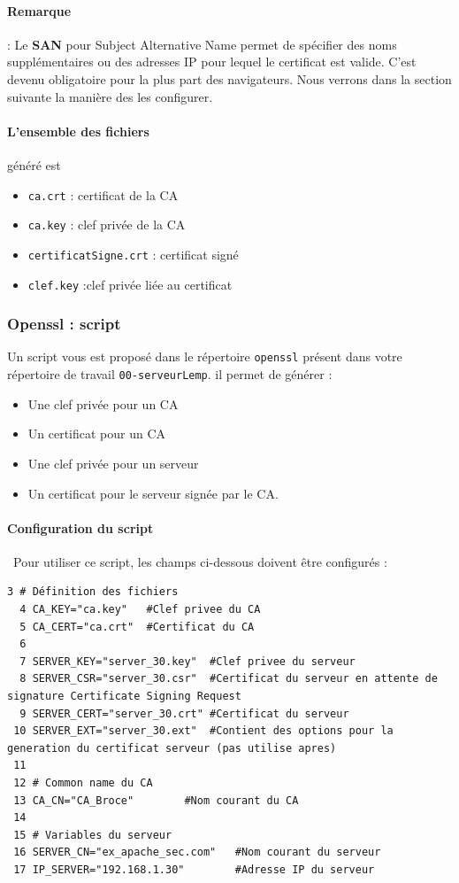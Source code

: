 \documentclass[french, 12pt]{article}%
\newcommand{\itemE}{\item[$\bullet$]}
\begin{document}
\paragraph{Remarque } :  Le \textbf{SAN} pour Subject Alternative Name permet de spécifier des noms supplémentaires ou des adresses IP pour lequel le certificat est valide. C'est devenu obligatoire pour la plus part des navigateurs.  Nous verrons dans la section suivante la manière des les configurer.


\paragraph{L'ensemble des fichiers } généré est 
\begin{itemize}
\itemE \verb?ca.crt? : certificat de la CA
\itemE \verb?ca.key? : clef privée de la CA
\itemE \verb?certificatSigne.crt? : certificat signé
\itemE \verb?clef.key? :clef privée liée au certificat
\end{itemize}

\subsubsection{Openssl : script}
\label{lbl_script}
Un script vous est proposé dans le répertoire \verb?openssl? présent dans votre répertoire de travail \verb?00-serveurLemp?. il permet de générer : 
\begin{itemize}
\itemE Une clef privée pour un CA
\itemE Un certificat pour un CA
\itemE Une clef privée pour un serveur
\itemE Un certificat pour le serveur signée par le CA.
\end{itemize}

\paragraph{Configuration du script} \ 
Pour utiliser ce script, les champs ci-dessous doivent être configurés : 

\begin{lstlisting}[style=commande]
  3 # Définition des fichiers
  4 CA_KEY="ca.key"   #Clef privee du CA
  5 CA_CERT="ca.crt"  #Certificat du CA
  6 
  7 SERVER_KEY="server_30.key"  #Clef privee du serveur
  8 SERVER_CSR="server_30.csr"  #Certificat du serveur en attente de signature Certificate Signing Request
  9 SERVER_CERT="server_30.crt" #Certificat du serveur
 10 SERVER_EXT="server_30.ext"  #Contient des options pour la generation du certificat serveur (pas utilise apres)
 11 
 12 # Common name du CA
 13 CA_CN="CA_Broce"        #Nom courant du CA
 14 
 15 # Variables du serveur
 16 SERVER_CN="ex_apache_sec.com"   #Nom courant du serveur
 17 IP_SERVER="192.168.1.30"        #Adresse IP du serveur    
\end{lstlisting}
\end{document}
